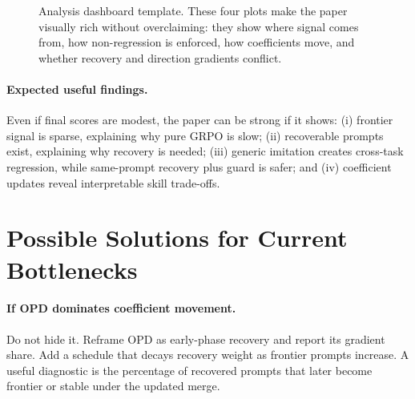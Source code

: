 \documentclass[11pt]{article}
\begin{document}
\begin{figure}[t]
\centering
{}
\caption{Analysis dashboard template.  These four plots make the paper visually rich without overclaiming: they show where signal comes from, how non-regression is enforced, how coefficients move, and whether recovery and direction gradients conflict.}
\label{fig:dashboard}
\end{figure}

\paragraph{Expected useful findings.}  Even if final scores are modest, the paper can be strong if it shows: (i) frontier signal is sparse, explaining why pure GRPO is slow; (ii) recoverable prompts exist, explaining why recovery is needed; (iii) generic imitation creates cross-task regression, while same-prompt recovery plus guard is safer; and (iv) coefficient updates reveal interpretable skill trade-offs.

\section{Possible Solutions for Current Bottlenecks}

\paragraph{If OPD dominates coefficient movement.}  Do not hide it.  Reframe OPD as early-phase recovery and report its gradient share.  Add a schedule that decays recovery weight as frontier prompts increase.  A useful diagnostic is the percentage of recovered prompts that later become frontier or stable under the updated merge.
\end{document}
